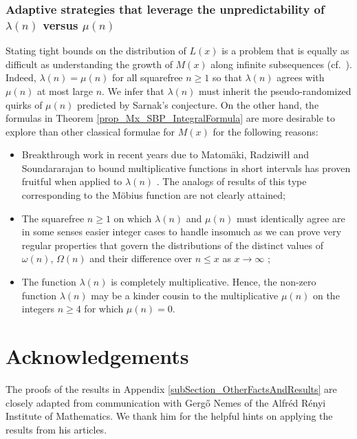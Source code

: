 \documentclass[11pt,reqno,a4letter]{article}
\newcommand{\hlocalref}[1]{\hyperref[#1]{\ref{#1}}}
\numberwithin{equation}{section}
\numberwithin{figure}{section}
\numberwithin{table}{section}
\let\citep\cite
\newcommand{\cf}{cf.~}
\theoremstyle{plain}
\numberwithin{theorem}{section}
\theoremstyle{definition}
\theoremstyle{remark}
\begin{document}
\subsubsection{Adaptive strategies that leverage the unpredictability of $\lambda(n)$ versus $\mu(n)$}

Stating tight bounds on the distribution of 
$L(x)$ is a problem that is equally as difficult 
as understanding the growth of $M(x)$
along infinite subsequences (\cf \cite{MR2877066,MR3779960,TAO-LOGAVGD-CHOWLA}). 
Indeed, $\lambda(n) = \mu(n)$ for all squarefree $n \geq 1$ so that 
$\lambda(n)$ agrees with $\mu(n)$ at most large $n$. 
We infer that $\lambda(n)$ must inherit the pseudo-randomized quirks 
of $\mu(n)$ predicted by Sarnak's conjecture. 
On the other hand, the formulas in 
Theorem \hlocalref{prop_Mx_SBP_IntegralFormula} are more desirable to explore than 
other classical formulae for $M(x)$ for the following reasons:
\begin{itemize}
\item Breakthrough work in recent years due to 
	 Matom\"aki, Radziwi{\l\l} and Soundararajan to 
	 bound multiplicative functions 
	 in short intervals has 
	 proven fruitful when applied to $\lambda(n)$ 
	 \cite{SOUND-LLAMBDA-SHORT-INTS,MATRADZE-MULTFUNCS-SHORT-INTS}. 
	 The analogs of results of this type corresponding 
	 to the M\"obius function are not clearly attained; 
\item The squarefree $n \geq 1$ on which $\lambda(n)$ and $\mu(n)$ must identically agree 
	 are in some senses easier integer cases to handle 
	 insomuch as we can prove very regular properties 
	 that govern the distributions of the distinct values of 
	 $\omega(n)$, $\Omega(n)$ and their difference over $n \leq x$ as $x \rightarrow \infty$ 
	 \citep[\cf \S 2.4; \S 7.4]{MV}; 
\item The function $\lambda(n)$ is completely 
	 multiplicative. Hence, the non-zero function $\lambda(n)$ may be 
	 a kinder cousin to the multiplicative $\mu(n)$ on the 
	 integers $n \geq 4$ for which $\mu(n) = 0$. 
\end{itemize}

\section*{Acknowledgements}

The proofs of the results in 
Appendix \hlocalref{subSection_OtherFactsAndResults} 
are closely adapted from communication with 
Gerg\H{o} Nemes of the Alfr\'{e}d R\'{e}nyi Institute of Mathematics. 
We thank him for the helpful hints on applying the results from his articles. 
\end{document}

